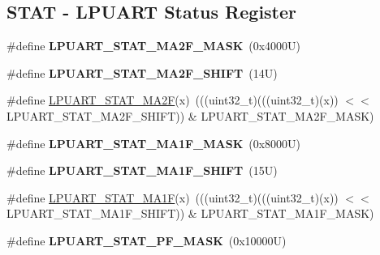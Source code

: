 \subsection*{S\+T\+AT -\/ L\+P\+U\+A\+RT Status Register}
\begin{DoxyCompactItemize}
\item 
\mbox{\label{group___l_p_u_a_r_t___register___masks_gab448ab1f4b8311a97814f60a7b0341f2}} 
\#define {\bfseries L\+P\+U\+A\+R\+T\+\_\+\+S\+T\+A\+T\+\_\+\+M\+A2\+F\+\_\+\+M\+A\+SK}~(0x4000\+U)
\item 
\mbox{\label{group___l_p_u_a_r_t___register___masks_ga5e214ea9e5058041f1c8b9c26209eb90}} 
\#define {\bfseries L\+P\+U\+A\+R\+T\+\_\+\+S\+T\+A\+T\+\_\+\+M\+A2\+F\+\_\+\+S\+H\+I\+FT}~(14\+U)
\item 
\#define \mbox{\hyperlink{group___l_p_u_a_r_t___register___masks_gab487fe8b26dbcaaf9dd7531aa8780087}{L\+P\+U\+A\+R\+T\+\_\+\+S\+T\+A\+T\+\_\+\+M\+A2F}}(x)~(((uint32\+\_\+t)(((uint32\+\_\+t)(x)) $<$$<$ L\+P\+U\+A\+R\+T\+\_\+\+S\+T\+A\+T\+\_\+\+M\+A2\+F\+\_\+\+S\+H\+I\+FT)) \& L\+P\+U\+A\+R\+T\+\_\+\+S\+T\+A\+T\+\_\+\+M\+A2\+F\+\_\+\+M\+A\+SK)
\item 
\mbox{\label{group___l_p_u_a_r_t___register___masks_gac9c67f85e56d6b2feaf825247f1df8fb}} 
\#define {\bfseries L\+P\+U\+A\+R\+T\+\_\+\+S\+T\+A\+T\+\_\+\+M\+A1\+F\+\_\+\+M\+A\+SK}~(0x8000\+U)
\item 
\mbox{\label{group___l_p_u_a_r_t___register___masks_ga0073d96a82b97a6d3c5dd5782d0fc366}} 
\#define {\bfseries L\+P\+U\+A\+R\+T\+\_\+\+S\+T\+A\+T\+\_\+\+M\+A1\+F\+\_\+\+S\+H\+I\+FT}~(15\+U)
\item 
\#define \mbox{\hyperlink{group___l_p_u_a_r_t___register___masks_gabab7c241b5ce9d1a556ab56792fe782f}{L\+P\+U\+A\+R\+T\+\_\+\+S\+T\+A\+T\+\_\+\+M\+A1F}}(x)~(((uint32\+\_\+t)(((uint32\+\_\+t)(x)) $<$$<$ L\+P\+U\+A\+R\+T\+\_\+\+S\+T\+A\+T\+\_\+\+M\+A1\+F\+\_\+\+S\+H\+I\+FT)) \& L\+P\+U\+A\+R\+T\+\_\+\+S\+T\+A\+T\+\_\+\+M\+A1\+F\+\_\+\+M\+A\+SK)
\item 
\mbox{\label{group___l_p_u_a_r_t___register___masks_ga4e50537fdcfd8f3c6b0b31bec75471f8}} 
\#define {\bfseries L\+P\+U\+A\+R\+T\+\_\+\+S\+T\+A\+T\+\_\+\+P\+F\+\_\+\+M\+A\+SK}~(0x10000\+U)

\end{DoxyCompactItemize}
